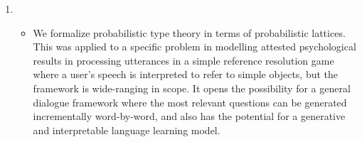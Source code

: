 \documentclass[12pt]{article}
\begin{document}
\begin{enumerate}
\item{}\begin{itemize}
\item[] We formalize probabilistic type theory in terms of probabilistic lattices. This was applied to a specific problem in modelling attested psychological results in processing utterances in a simple reference resolution game where a user's speech is interpreted to refer to simple objects, but the framework is wide-ranging in scope. It opens the possibility for a general dialogue framework where the most relevant questions can be generated incrementally word-by-word, and also has the potential for a generative and interpretable language learning model.

\end{itemize}

\end{enumerate}



\end{document}
